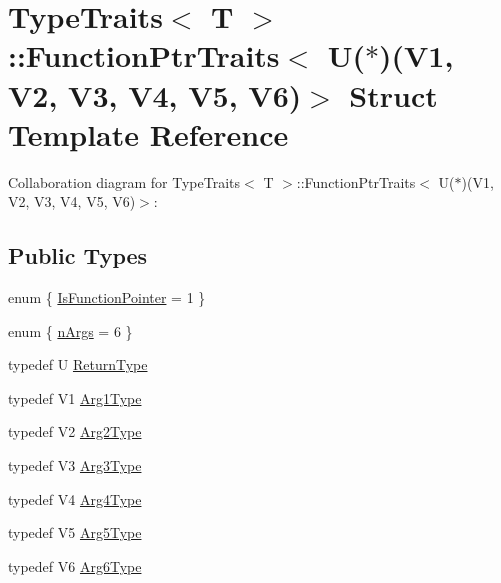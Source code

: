 \hypertarget{structTypeTraits_1_1FunctionPtrTraits_3_01U_07_5_08_07V1_00_01V2_00_01V3_00_01V4_00_01V5_00_01V6_08_4}{}\section{Type\+Traits$<$ T $>$\+:\+:Function\+Ptr\+Traits$<$ U($\ast$)(V1, V2, V3, V4, V5, V6)$>$ Struct Template Reference}
\label{structTypeTraits_1_1FunctionPtrTraits_3_01U_07_5_08_07V1_00_01V2_00_01V3_00_01V4_00_01V5_00_01V6_08_4}


Collaboration diagram for Type\+Traits$<$ T $>$\+:\+:Function\+Ptr\+Traits$<$ U($\ast$)(V1, V2, V3, V4, V5, V6)$>$\+:
\subsection*{Public Types}
\begin{DoxyCompactItemize}
\item 
enum \{ \hyperlink{structTypeTraits_1_1FunctionPtrTraits_3_01U_07_5_08_07V1_00_01V2_00_01V3_00_01V4_00_01V5_00_01V6_08_4_ad474c051b68c1297ffc1840625b42f26aab29d768295c2ebf4b3c59cbe4060dda}{Is\+Function\+Pointer} = 1
 \}
\item 
enum \{ \hyperlink{structTypeTraits_1_1FunctionPtrTraits_3_01U_07_5_08_07V1_00_01V2_00_01V3_00_01V4_00_01V5_00_01V6_08_4_a2f8b308bda1d2b38bdfe79c8a12bc392a51e7708e5bdba43999f440c36a28e56d}{n\+Args} = 6
 \}
\item 
typedef U \hyperlink{structTypeTraits_1_1FunctionPtrTraits_3_01U_07_5_08_07V1_00_01V2_00_01V3_00_01V4_00_01V5_00_01V6_08_4_ab7fc3905bb964e81f246de52f783e670}{Return\+Type}
\item 
typedef V1 \hyperlink{structTypeTraits_1_1FunctionPtrTraits_3_01U_07_5_08_07V1_00_01V2_00_01V3_00_01V4_00_01V5_00_01V6_08_4_a728aa95ab6b5b639af07e15b85b80b51}{Arg1\+Type}
\item 
typedef V2 \hyperlink{structTypeTraits_1_1FunctionPtrTraits_3_01U_07_5_08_07V1_00_01V2_00_01V3_00_01V4_00_01V5_00_01V6_08_4_a7e21720608853ba49f8dfc94a9d28db3}{Arg2\+Type}
\item 
typedef V3 \hyperlink{structTypeTraits_1_1FunctionPtrTraits_3_01U_07_5_08_07V1_00_01V2_00_01V3_00_01V4_00_01V5_00_01V6_08_4_afe267a3f617d6186d9034de80981fc2b}{Arg3\+Type}
\item 
typedef V4 \hyperlink{structTypeTraits_1_1FunctionPtrTraits_3_01U_07_5_08_07V1_00_01V2_00_01V3_00_01V4_00_01V5_00_01V6_08_4_a48b3911e05ece280c5b7e002d3372123}{Arg4\+Type}
\item 
typedef V5 \hyperlink{structTypeTraits_1_1FunctionPtrTraits_3_01U_07_5_08_07V1_00_01V2_00_01V3_00_01V4_00_01V5_00_01V6_08_4_a2ac0a8dc03328fe76974f96c7df33f69}{Arg5\+Type}
\item 
typedef V6 \hyperlink{structTypeTraits_1_1FunctionPtrTraits_3_01U_07_5_08_07V1_00_01V2_00_01V3_00_01V4_00_01V5_00_01V6_08_4_af899df4f76ce03698802ce16e3a61548}{Arg6\+Type}
\end{DoxyCompactItemize}


